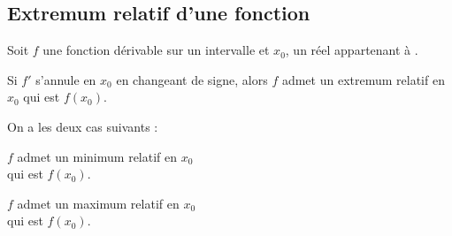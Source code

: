 \subsection{Extremum relatif d'une fonction}
\begin{propriete}[s]
Soit $f$ une fonction dérivable sur un intervalle  et $x_0$, un réel appartenant à .
\par Si $f'$ s'annule en $x_0$ en changeant de signe, alors $f$ admet un extremum relatif en $x_0$ qui est $f(x_0)$.
\par On a les deux cas suivants :\\
\begin{minipage}[c]{7.5cm}
\par $f$ admet un minimum relatif en $x_0$ \\qui est $f(x_0)$.
\end{minipage}
\begin{minipage}[c]{7.5cm}
	\par $f$ admet un maximum relatif en $x_0$\\ qui est $f(x_0)$.
\end{minipage}
\end{propriete}
